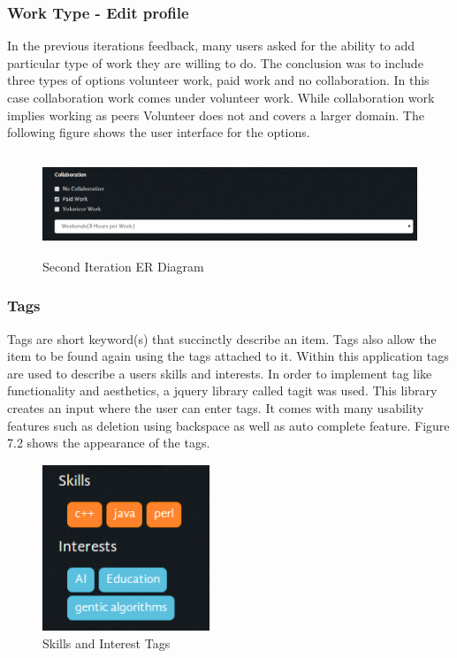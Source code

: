 \documentclass[a4paper,oneside,11pt]{report}
\begin{document}
\subsubsection{Work Type - Edit profile}
In the previous iterations feedback, many users asked for the ability to add particular type of work they are willing to do. The conclusion was to include three types of options volunteer work, paid work and no collaboration. In this case collaboration work comes under volunteer work. While collaboration work implies working as peers Volunteer does not and covers a larger domain. The following figure shows the user interface for the options.

\begin{figure}[!ht]
\centering
\includegraphics[width=\textwidth,height=3cm]{third-iteration-collaboration-availability.png}
\caption{Second Iteration ER Diagram}
\end{figure}
\pagebreak
\subsubsection{Tags}
Tags are short keyword(s) that succinctly describe an item. Tags also allow the item to be found again using the tags attached to it. Within this application tags are used to describe a users skills and interests. In order to implement tag like functionality and aesthetics, a jquery library called tagit was used. This library creates an input where the user can enter tags. It comes with many usability features such as deletion using backspace as well as auto complete feature. Figure 7.2 shows the appearance of the tags.

\begin{figure}[!ht]
\centering
\includegraphics[width=5cm,height=5cm]{third-iteration-tags.png}
\caption{Skills and Interest Tags}
\end{figure}
\end{document}
